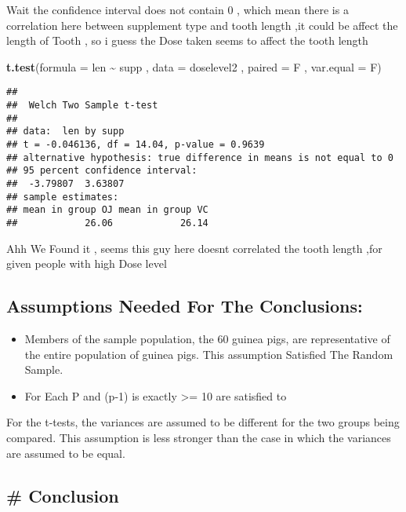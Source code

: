 \documentclass[
]{article}
\newenvironment{Shaded}{\begin{snugshade}}{\end{snugshade}}
\newcommand{\DataTypeTok}[1]{\textcolor[rgb]{0.13,0.29,0.53}{#1}}
\newcommand{\KeywordTok}[1]{\textcolor[rgb]{0.13,0.29,0.53}{\textbf{#1}}}
\newcommand{\NormalTok}[1]{#1}
\newcommand{\OperatorTok}[1]{\textcolor[rgb]{0.81,0.36,0.00}{\textbf{#1}}}
\newcommand{\StringTok}[1]{\textcolor[rgb]{0.31,0.60,0.02}{#1}}
\providecommand{\tightlist}{%
  \setlength{\itemsep}{0pt}\setlength{\parskip}{0pt}}
\begin{document}
Wait the confidence interval does not contain 0 , which mean there is a
correlation here between supplement type and tooth length ,it could be
affect the length of Tooth , so i guess the Dose taken seems to affect
the tooth length

\begin{Shaded}
\begin{Highlighting}[]
\KeywordTok{t.test}\NormalTok{(}\DataTypeTok{formula =}\NormalTok{ len }\OperatorTok{\textasciitilde{}}\StringTok{ }\NormalTok{supp , }\DataTypeTok{data =}\NormalTok{ doselevel2 , }\DataTypeTok{paired =}\NormalTok{ F , }\DataTypeTok{var.equal =}\NormalTok{ F) }
\end{Highlighting}
\end{Shaded}

\begin{verbatim}
## 
##  Welch Two Sample t-test
## 
## data:  len by supp
## t = -0.046136, df = 14.04, p-value = 0.9639
## alternative hypothesis: true difference in means is not equal to 0
## 95 percent confidence interval:
##  -3.79807  3.63807
## sample estimates:
## mean in group OJ mean in group VC 
##            26.06            26.14
\end{verbatim}

Ahh We Found it , seems this guy here doesnt correlated the tooth length
,for given people with high Dose level

\hypertarget{assumptions-needed-for-the-conclusions}{%
\subsection{Assumptions Needed For The
Conclusions:}\label{assumptions-needed-for-the-conclusions}}

\begin{itemize}
\tightlist
\item
  Members of the sample population, the 60 guinea pigs, are
  representative of the entire population of guinea pigs. This
  assumption Satisfied The Random Sample.
\item
  For Each P and (p-1) is exactly \textgreater= 10 are satisfied to
\end{itemize}

For the t-tests, the variances are assumed to be different for the two
groups being compared. This assumption is less stronger than the case in
which the variances are assumed to be equal.

\hypertarget{conclusion}{%
\subsection{\# Conclusion}\label{conclusion}}
\end{document}
